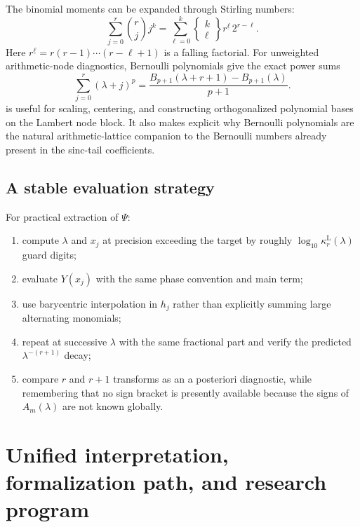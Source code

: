 \documentclass[11pt]{article}
\numberwithin{equation}{section}
\theoremstyle{definition}
\theoremstyle{remark}
\begin{document}
The binomial moments can be expanded through Stirling numbers:
\begin{equation}
\sum_{j=0}^{r}\binom{r}{j}j^k
=\sum_{\ell=0}^{k}
\left\{\begin{matrix}k\\\ell\end{matrix}\right\}
r^{\underline{\ell}}\,2^{r-\ell}.
\label{p8:eq:binomial-moments}
\end{equation}
Here $r^{\underline{\ell}}=r(r-1)\cdots(r-\ell+1)$ is a falling factorial. For unweighted arithmetic-node diagnostics, Bernoulli polynomials give the exact power sums
\begin{equation}
\sum_{j=0}^{r}(\lambda+j)^p
=\frac{B_{p+1}(\lambda+r+1)-B_{p+1}(\lambda)}{p+1}.
\label{p8:eq:bernoulli-power-sum}
\end{equation}
 is useful for scaling, centering, and constructing orthogonalized polynomial bases on the Lambert node block. It also makes explicit why Bernoulli polynomials are the natural arithmetic-lattice companion to the Bernoulli numbers already present in the sinc-tail coefficients.

\subsection{A stable evaluation strategy}

For practical extraction of $\Psi$:
\begin{enumerate}
\item compute $\lambda$ and $x_j$ at precision exceeding the target by roughly
$\log_{10}\kappa_r^{\mathrm L}(\lambda)$ guard digits;
\item evaluate $Y(x_j)$ with the same phase convention and main term;
\item use barycentric interpolation in $h_j$ rather than explicitly summing large alternating monomials;
\item repeat at successive $\lambda$ with the same fractional part and verify the predicted $\lambda^{-(r+1)}$ decay;
\item compare $r$ and $r+1$ transforms as an a posteriori diagnostic, while remembering that no sign bracket is presently available because the signs of $A_m(\lambda)$ are not known globally.
\end{enumerate}

\section{Unified interpretation, formalization path, and research program}
\end{document}
